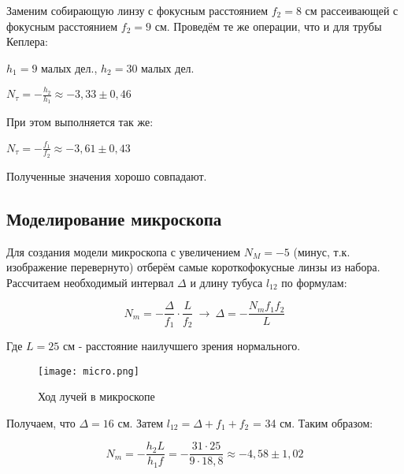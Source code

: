 Заменим собирающую линзу с фокусным расстоянием $f_2 = 8$ см рассеивающей с фокусным расстоянием $f_2 = 9$ см. Проведём те же операции, что и для трубы Кеплера:

\begin{center}
$h_1 = 9$ малых дел., \hspace{1cm} $h_2 = 30$ малых дел. \par
$N_{\tau} = -\frac{h_2}{h_1} \approx -3,33 \pm 0,46$
\end{center}

При этом выполняется так же:

\begin{center}
    $N_{\tau} = -\frac{f_1}{f_2} \approx -3,61 \pm 0,43$
\end{center}

Полученные значения хорошо совпадают.


\subsection{Моделирование микроскопа}

Для создания модели микроскопа с увеличением $N_M = -5$ (минус, т.к. изображение перевернуто) отберём самые короткофокусные линзы из набора. 
Рассчитаем необходимый интервал $\Delta$ и длину тубуса  $l_12$ по формулам:

\[ N_m = -\frac{\Delta}{f_1} \cdot \frac{L}{f_2} \: \rightarrow \: \Delta = -\frac{N_m f_1 f_2}{L}  \]


Где $L = 25$ см - расстояние наилучшего зрения нормального. 

\begin{figure}[h!]
    \centering
    \texttt{[image: micro.png]}
    \caption{Ход лучей в микроскопе}
    \label{}
\end{figure}


Получаем, что $\Delta = 16$ см. Затем $l_12 = \Delta + f_1 + f_2$ = 34 см.
Таким образом:

\[   N_m = -\frac{h_2 L}{h_1 f} = -\frac{31 \cdot 25}{9 \cdot 18,8} \approx -4,58  \pm 1,02  \]
